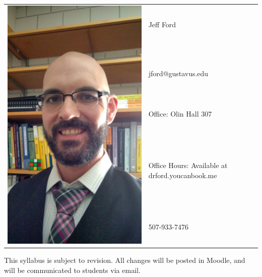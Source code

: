 \documentclass[11pt]{article}
\begin{document}
\begin{tabular}{ l l }
  \multirow{6}{*}{\includegraphics[scale=0.05]{Fa16_selfie.jpg}} & \large Jeff Ford \\\\
  & \large jford@gustavus.edu \\
  & \large Office: Olin Hall 307 \\
  & \large Office Hours: Available at drford.youcanbook.me \\
  & \large 507-933-7476 \\
\end{tabular}
\vspace{5mm}
\begin{center} This syllabus is subject to revision. All changes will be posted in Moodle, and will be communicated to students via email. \\
\end{center}
\end{document}
